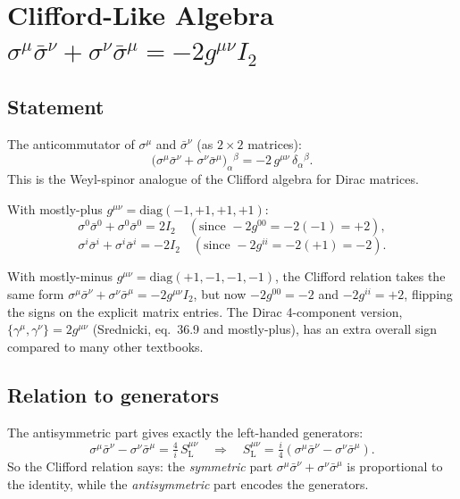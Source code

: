 \documentclass[12pt]{article}
\begin{document}
\section{Clifford-Like Algebra \quad
         \texorpdfstring{$\sigma^\mu\bar\sigma^\nu + \sigma^\nu\bar\sigma^\mu
         = -2g^{\mu\nu}I_2$}{Clifford}}

\subsection{Statement}

The anticommutator of $\sigma^\mu$ and $\bar\sigma^\nu$ (as $2\times2$ matrices):
\begin{equation}
  \bigl(\sigma^\mu\bar\sigma^\nu + \sigma^\nu\bar\sigma^\mu\bigr)_\alpha{}^\beta
  = -2\,g^{\mu\nu}\,\delta_\alpha{}^\beta.
  \tag{35-Clifford}
\end{equation}
This is the Weyl-spinor analogue of the Clifford algebra for Dirac matrices.

With mostly-plus $g^{\mu\nu}=\mathrm{diag}(-1,+1,+1,+1)$:
\[
  \sigma^0\bar\sigma^0 + \sigma^0\bar\sigma^0 = 2I_2
  \quad(\text{since } -2g^{00}=-2(-1)=+2),
\]
\[
  \sigma^i\bar\sigma^i + \sigma^i\bar\sigma^i = -2I_2
  \quad(\text{since } -2g^{ii}=-2(+1)=-2).
\]

\begin{metricnote}
With mostly-minus $g^{\mu\nu}=\mathrm{diag}(+1,-1,-1,-1)$, the Clifford
relation takes the same form $\sigma^\mu\bar\sigma^\nu+\sigma^\nu\bar\sigma^\mu=-2g^{\mu\nu}I_2$,
but now $-2g^{00}=-2$ and $-2g^{ii}=+2$, flipping the signs on the
explicit matrix entries.  The Dirac 4-component version,
$\{\gamma^\mu,\gamma^\nu\}=2g^{\mu\nu}$ (Srednicki, eq.~36.9 and mostly-plus),
has an extra overall sign compared to many other textbooks.
\end{metricnote}

\subsection{Relation to generators}

The antisymmetric part gives exactly the left-handed generators:
\[
  \sigma^\mu\bar\sigma^\nu - \sigma^\nu\bar\sigma^\mu
  = \tfrac{4}{i}\,S^{\mu\nu}_{\mathrm{L}}
  \quad\Longrightarrow\quad
  S^{\mu\nu}_{\mathrm{L}} = \tfrac{i}{4}
  (\sigma^\mu\bar\sigma^\nu - \sigma^\nu\bar\sigma^\mu).
\]
So the Clifford relation says: the \emph{symmetric} part
$\sigma^\mu\bar\sigma^\nu + \sigma^\nu\bar\sigma^\mu$ is proportional to
the identity, while the \emph{antisymmetric} part encodes the generators.
\end{document}

